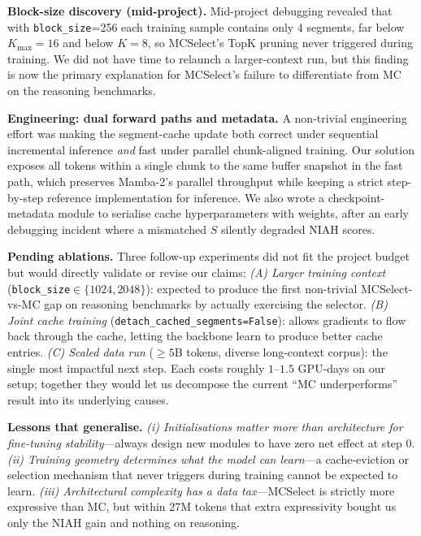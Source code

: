\documentclass[conference]{IEEEtran}
\begin{document}
\textbf{Block-size discovery (mid-project).} Mid-project debugging revealed that with \texttt{block\_size}=256 each training sample contains only $4$ segments, far below $K_{\max}{=}16$ and below $K{=}8$, so MCSelect's TopK pruning never triggered during training. We did not have time to relaunch a larger-context run, but this finding is now the primary explanation for MCSelect's failure to differentiate from MC on the reasoning benchmarks.

\textbf{Engineering: dual forward paths and metadata.} A non-trivial engineering effort was making the segment-cache update both correct under sequential incremental inference \emph{and} fast under parallel chunk-aligned training. Our solution exposes all tokens within a single chunk to the same buffer snapshot in the fast path, which preserves Mamba-2's parallel throughput while keeping a strict step-by-step reference implementation for inference. We also wrote a checkpoint-metadata module to serialise cache hyperparameters with weights, after an early debugging incident where a mismatched $S$ silently degraded NIAH scores.

\textbf{Pending ablations.} Three follow-up experiments did not fit the project budget but would directly validate or revise our claims:
\emph{(A) Larger training context} (\texttt{block\_size}$\in\{1024,2048\}$): expected to produce the first non-trivial MCSelect-vs-MC gap on reasoning benchmarks by actually exercising the selector.
\emph{(B) Joint cache training} (\texttt{detach\_cached\_segments=False}): allows gradients to flow back through the cache, letting the backbone learn to produce better cache entries.
\emph{(C) Scaled data run} ($\ge 5$B tokens, diverse long-context corpus): the single most impactful next step. Each costs roughly $1$--$1.5$ GPU-days on our setup; together they would let us decompose the current ``MC underperforms'' result into its underlying causes.

\textbf{Lessons that generalise.}
\emph{(i) Initialisations matter more than architecture for fine-tuning stability}---always design new modules to have zero net effect at step 0.
\emph{(ii) Training geometry determines what the model can learn}---a cache-eviction or selection mechanism that never triggers during training cannot be expected to learn.
\emph{(iii) Architectural complexity has a data tax}---MCSelect is strictly more expressive than MC, but within $27$M tokens that extra expressivity bought us only the NIAH gain and nothing on reasoning.

\end{document}
